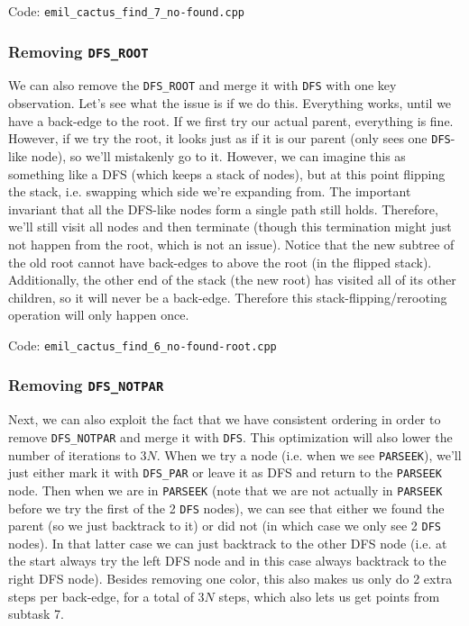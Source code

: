 \documentclass{article}
\begin{document}
Code: \verb|emil_cactus_find_7_no-found.cpp|

\subsubsection{Removing \texttt{DFS\_ROOT}}

We can also remove the \verb|DFS_ROOT| and merge it with \verb|DFS| with one key observation. Let's see what the issue is if we do this. Everything works, until we have a back-edge to the root. If we first try our actual parent, everything is fine. However, if we try the root, it looks just as if it is our parent (only sees one \verb|DFS|-like node), so we'll mistakenly go to it. However, we can imagine this as something like a DFS (which keeps a stack of nodes), but at this point flipping the stack, i.e. swapping which side we're expanding from. The important invariant that all the DFS-like nodes form a single path still holds. Therefore, we'll still visit all nodes and then terminate (though this termination might just not happen from the root, which is not an issue). Notice that the new subtree of the old root cannot have back-edges to above the root (in the flipped stack). Additionally, the other end of the stack (the new root) has visited all of its other children, so it will never be a back-edge. Therefore this stack-flipping/rerooting operation will only happen once.

Code: \verb|emil_cactus_find_6_no-found-root.cpp|

\subsubsection{Removing \texttt{DFS\_NOTPAR}}

Next, we can also exploit the fact that we have consistent ordering in order to remove \verb|DFS_NOTPAR| and merge it with \verb|DFS|. This optimization will also lower the number of iterations to $3N$. When we try a node (i.e. when we see \verb|PARSEEK|), we'll just either mark it with \verb|DFS_PAR| or leave it as DFS and return to the \verb|PARSEEK| node. Then when we are in \verb|PARSEEK| (note that we are not actually in \verb|PARSEEK| before we try the first of the 2 \verb|DFS| nodes), we can see that either we found the parent (so we just backtrack to it) or did not (in which case we only see 2 \verb|DFS| nodes). In that latter case we can just backtrack to the other DFS node (i.e. at the start always try the left DFS node and in this case always backtrack to the right DFS node). Besides removing one color, this also makes us only do 2 extra steps per back-edge, for a total of $3N$ steps, which also lets us get points from subtask 7.
\end{document}
